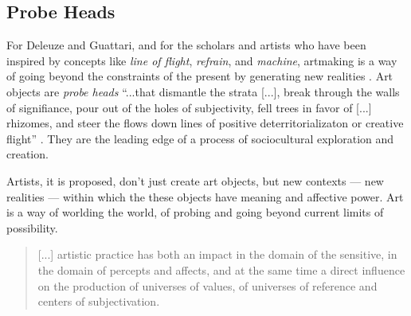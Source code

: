 
    \subsection{Probe Heads} \label{sec:ProbeHeads}
        
        For Deleuze and Guattari, and for the scholars and artists who have been inspired by concepts like \emph{line of flight}, \emph{refrain}, and \emph{machine}, artmaking is a way of going beyond the constraints of the present by generating new realities \citep[p.3]{ZepkeOSullivanDlzCntmprryArt2010}. Art objects are \emph{probe heads} “...that dismantle the strata [...], break through the walls of signifiance, pour out of the holes of subjectivity, fell trees in favor of [...] rhizomes, and steer the flows down lines of positive deterritorializaton or creative flight” \citep[p.190]{DeleuzeGuattariAThousandPlateaus1987}. They are the leading edge of a process of sociocultural exploration and creation.

        Artists, it is proposed, don't just create art objects, but new contexts — new realities — within which the these objects have meaning and affective power. Art is a way of worlding the world, of probing and going beyond current limits of possibility.

        \begin{quote}
            [...] artistic practice has both an impact in the domain of the sensitive, in the domain of percepts and affects, and at the same time a direct influence on the production of universes of values, of universes of reference and centers of subjectivation. \citep[p.4]{GuattariOlivierFlxGttrEtLArtCntmprn1994}
        \end{quote}

